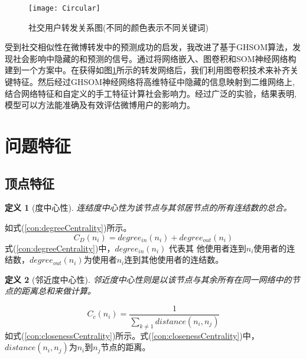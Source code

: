 \begin{figure}[!htbp]
    \centering
    \texttt{[image: Circular]}
    \caption{社交用户转发关系图(不同的颜色表示不同关键词)}
    \label{fig:Circular}
\end{figure}

受到社交相似性在微博转发中的预测成功的启发\cite{2015similarity}，我改进了基于GHSOM\cite{2018UserInfluenc}算法，发现社会影响中隐藏的和预测的信号。通过将网络嵌入\cite{Qiu:2018:NEM:3159652.3159706}、图卷积\cite{kipf2017semi}和SOM神经网络构建到一个方案中。在获得如图\ref{fig:Circular}所示的转发网络后，我们利用图卷积技术来补齐关键特征。然后经过GHSOM神经网络将高维特征中隐藏的信息映射到二维网络上,结合网络特征和自定义的手工特征计算社会影响力。经过广泛的实验，结果表明,模型可以方法能准确及有效评估微博用户的影响力。

\newtheorem{theorem}{定义}[subsection]
\section{问题特征}\label{sec:question}

\subsection{顶点特征}
\begin{theorem}[度中心性]
连结度中心性为该节点与其邻居节点的所有连结数的总合。
\end{theorem}
如式(\ref{con:degreeCentrality})所示。
\begin{equation}
C_D(n_i)=degree_{in}(n_i)+degree_{out}(n_i)
\label{con:degreeCentrality}
\end{equation}
式(\ref{con:degreeCentrality})中，$degree_{in}(n_i)$ 代表其 他使用者连到$n_i$使用者的连结数，$degree_{out}(n_i)$为使用者$n_i$连到其他使用者的连结数。



\begin{theorem}[邻近度中心性]
邻近度中心性则是以该节点与其余所有在同一网络中的节点的距离总和来做计算。
\end{theorem}
\begin{equation}
C_c(n_i)=\frac{1}{\sum_{k\neq1} distance(n_i,n_j)}
\label{con:closenessCentrality}
\end{equation}
如式(\ref{con:closenessCentrality})所示。式(\ref{con:closenessCentrality})中，$distance(n_i,n_j)$为$n_i$到$n_j$节点的距离。





